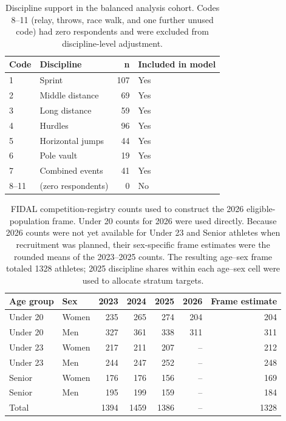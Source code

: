 \begin{table}[htbp]
\centering
\caption{Discipline support in the balanced analysis cohort. Codes 8--11 (relay, throws, race walk, and one further unused code) had zero respondents and were excluded from discipline-level adjustment.}
\label{tab:discipline-support}
\begin{tabular}{llrl}
\toprule
Code & Discipline & n & Included in model \\
\midrule
1 & Sprint & 107 & Yes \\
2 & Middle distance & 69 & Yes \\
3 & Long distance & 59 & Yes \\
4 & Hurdles & 96 & Yes \\
5 & Horizontal jumps & 44 & Yes \\
6 & Pole vault & 19 & Yes \\
7 & Combined events & 41 & Yes \\
8--11 & (zero respondents) & 0 & No \\
\bottomrule
\end{tabular}
\end{table}

\begin{table}[htbp]
\centering
\caption{FIDAL competition-registry counts used to construct the 2026 eligible-population frame. Under 20 counts for 2026 were used directly. Because 2026 counts were not yet available for Under 23 and Senior athletes when recruitment was planned, their sex-specific frame estimates were the rounded means of the 2023--2025 counts. The resulting age--sex frame totaled 1328 athletes; 2025 discipline shares within each age--sex cell were used to allocate stratum targets.}
\label{tab:population-frame-history}
\begin{tabular}{llrrrrr}
\toprule
Age group & Sex & 2023 & 2024 & 2025 & 2026 & Frame estimate \\
\midrule
Under 20 & Women & 235 & 265 & 274 & 204 & 204 \\
Under 20 & Men & 327 & 361 & 338 & 311 & 311 \\
Under 23 & Women & 217 & 211 & 207 & -- & 212 \\
Under 23 & Men & 244 & 247 & 252 & -- & 248 \\
Senior & Women & 176 & 176 & 156 & -- & 169 \\
Senior & Men & 195 & 199 & 159 & -- & 184 \\
\midrule
Total & & 1394 & 1459 & 1386 & -- & 1328 \\
\bottomrule
\end{tabular}
\end{table}

